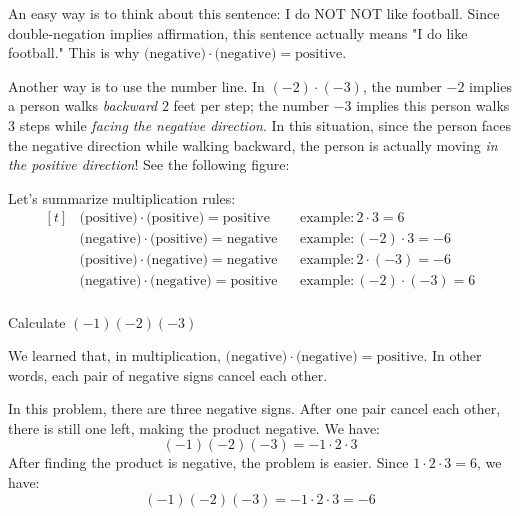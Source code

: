 An easy way is to think about this sentence: I do NOT NOT like football. Since double-negation implies affirmation, this sentence actually means "I do like football." This is why $ \text{(negative)}\cdot\text{(negative)}=\text{positive} $.

Another way is to use the number line. In $(-2)\cdot(-3)$, the number $-2$ implies a person walks \textit{backward} $2$ feet per step; the number $-3$ implies this person walks $3$ steps while \textit{facing the negative direction}. In this situation, since the person faces the negative direction while walking backward, the person is actually moving \textit{in the positive direction}! See the following figure:

		\begin{tightcenter}
		\end{tightcenter}

Let's summarize multiplication rules:
\[
\begin{aligned}[t]
	&\text{(positive)}\cdot\text{(positive)}=\text{positive}&&\text{example}: 2\cdot3=6\\
	&\text{(negative)}\cdot\text{(positive)}=\text{negative}&&\text{example}: (-2)\cdot3=-6\\
	&\text{(positive)}\cdot\text{(negative)}=\text{negative}&&\text{example}: 2\cdot(-3)=-6\\
	&\text{(negative)}\cdot\text{(negative)}=\text{positive}&&\text{example}: (-2)\cdot(-3)=6\\
\end{aligned}
\]

\begin{myexample}
Calculate $(-1)(-2)(-3)$
\end{myexample}
\begin{solution}
We learned that, in multiplication, $\text{(negative)}\cdot\text{(negative)}=\text{positive}$. In other words, each pair of negative signs cancel each other.

In this problem, there are three negative signs. After one pair cancel each other, there is still one left, making the product negative. We have:
	\[ (-1)(-2)(-3)=-1\cdot2\cdot3 \]
After finding the product is negative, the problem is easier. Since $1\cdot2\cdot3=6$, we have:
	\[ (-1)(-2)(-3)=-1\cdot2\cdot3 = -6 \]
\end{solution}

